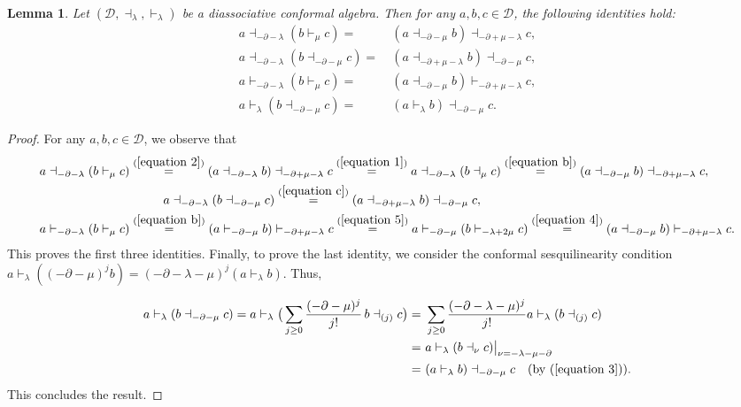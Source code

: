 \documentclass[a4paper,reqno,10pt]{amsart}
\theoremstyle{plain}
\newtheorem{lemma}[thm]{Lemma}
\theoremstyle{definition}
\theoremstyle{remark}
\newcommand{\D}{\mathcal{D}}
\newcommand{\p}{\partial}
\newcommand{\la}{\lambda}
\begin{document}
\begin{lemma} \label{ lemma 1}
    Let $(\D, \dashv_{\la}, \vdash_{\la})$ be a diassociative conformal algebra. Then for any $a,b,c \in \D$, the following identities hold: 
    \begin{align}
         a \dashv_{-\p -\la}(b \vdash _{\mu}c) =~& (a \dashv _{-\p -\mu} b) \dashv _{-\p + \mu-\la } c, \label{edi-1}\\
        a \dashv_{-\p -\la}( b \dashv _{-\p -\mu} c) =~& (a \dashv _{-\p+ \mu -\la } b) \dashv _{-\p -\mu} c, \label{edi-2}\\
        a \vdash_{-\p - \la}(b \vdash_{\mu} c) =~& (a \dashv_{-\p -\mu}b)\vdash_{-\p + \mu-\la }c,\label{edi-3}\\
        a \vdash _{\la} (b \dashv _{-\p -\mu} c) =~& (a \vdash _{\la} b) \dashv_{ -\p -\mu} c\label{edi-4}.
    \end{align}
\end{lemma}

\begin{proof}
    For any $a,b,c \in \D$, we observe that
\begin{align*}
  & a \dashv_{-\p -\la}(b \vdash_{\mu}c) \stackrel{(\ref{equation 2})}{=} (a \dashv_{-\p -\la}b) \dashv_{-\p+\mu-\la}c 
   \stackrel{(\ref{equation 1})}{=}a \dashv_{-\p -\la}(b \dashv_{\mu} c)
    \stackrel{(\ref{equation b})}{=} (a \dashv_{-\p -\mu}b) \dashv_{-\p +\mu-\la} c,\\
  & \qquad \qquad \qquad \qquad \qquad a \dashv_{-\p-\la}(b \dashv_{-\p-\mu}c) \stackrel{(\ref{equation c})}{=} (a\dashv_{-\p+\mu-\la}b)\dashv_{-\p-\mu}c,\\
  &   a \vdash_{-\p - \la}(b \vdash_{\mu} c)  \stackrel{(\ref{equation b})}{=}(a \vdash_{-\p-\mu}b)\vdash_{-\p+\mu-\la}c
    \stackrel{(\ref{equation 5})}{=}a \vdash_{-\p-\mu}(b \vdash_{-\la+2\mu}c)
     \stackrel{(\ref{equation 4})}{=}(a\dashv_{-\p-\mu}b)\vdash_{-\p+\mu-\la}c.
\end{align*}
This proves the first three identities. Finally, to prove the last identity, we consider the conformal sesquilinearity condition $a \vdash_{\la}\left( (-\p-\mu)^{j} b \right)=(-\p-\la-\mu)^{j} (a \vdash_{\la}b)$. Thus,

\begin{align*}
a \vdash_{\la}(b \dashv_{-\partial-\mu}c)
= a \vdash_\la \big(  \sum_{j \geq 0} \frac{(-\partial - \mu)^j}{j!} ~ \! b \dashv_{(j)} c  \big) =~& 
\sum_{j\geq 0}
\frac{(-\partial-\la-\mu)^j}{j!}
a \vdash_{\la}(b \dashv_{(j)}c) \\
=~&
a \vdash_{\la}(b \dashv_{\nu}c)\big|_{\nu=-\la-\mu-\partial} \\
=~& (a \vdash _{\la} b) \dashv_{ -\p -\mu} c \quad (\text{by } (\ref{equation 3})).
\end{align*}
This concludes the result.
\end{proof}
\end{document}
